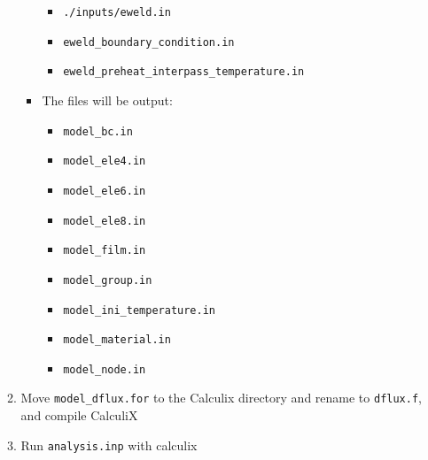 \documentclass[12pt,letterpaper]{article}
\newcommand{\verbStyle}[1]{{\color{SteelBlue40}\colorbox{LightSteelBlue10}{{#1}}}}
\let\OldTexttt\texttt
\renewcommand{\texttt}[1]{\OldTexttt{\verbStyle{#1}}}
\begin{document}
\begin{itemize}
\begin{enumerate}
\begin{itemize}
\begin{itemize}
\item \texttt{./inputs/eweld.in}
\item \texttt{eweld\_boundary\_condition.in}
\item \texttt{eweld\_preheat\_interpass\_temperature.in}
\end{itemize}
\item The files will be output:
\begin{itemize}
\item \texttt{model\_bc.in}
\item \texttt{model\_ele4.in}
\item \texttt{model\_ele6.in}
\item \texttt{model\_ele8.in}
\item \texttt{model\_film.in}
\item \texttt{model\_group.in}
\item \texttt{model\_ini\_temperature.in}
\item \texttt{model\_material.in}
\item \texttt{model\_node.in}
\end{itemize}
\end{itemize}
\item Move \texttt{model\_dflux.for} to the Calculix directory and rename to \texttt{dflux.f}, and compile CalculiX
\item Run \texttt{analysis.inp} with calculix
\end{enumerate}
\end{itemize}
\end{document}
